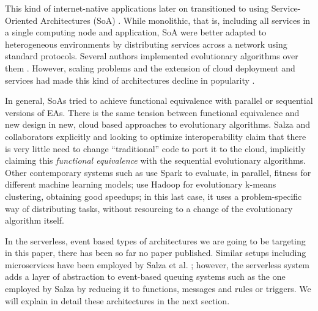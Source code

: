 \documentclass[sigconf]{acmart}
\begin{document}
This kind of internet-native applications later on transitioned to
using Service-Oriented Architectures (SoA) \cite{Papazoglou2007}. While monolithic, that is,
including all services in a single computing node and application, SoA
were better adapted to heterogeneous environments by distributing
services across a network using standard protocols. Several authors
implemented evolutionary algorithms over them
\cite{garcia2013service,munawar2010design,6955331}. However, scaling
problems and the extension of cloud deployment and services had made
this kind of architectures decline in popularity
\cite{Varghese2018849}.

In general, SoAs tried to achieve functional equivalence with parallel
or sequential versions of EAs. There is the same tension between
functional equivalence and new
design in new, cloud based approaches to evolutionary
algorithms. Salza and collaborators \cite{salza2017ccube,de2017parallel} explicitly
and looking to optimize interoperability claim that there is very
little need to change ``traditional'' code to port it to the cloud,
implicitly claiming this {\em functional equivalence} with the
sequential evolutionary algorithms. Other contemporary systems such as
\cite{10.1007/978-3-319-32149-3_46} use Spark to evaluate, in
parallel, fitness for different machine learning models;
\cite{de2015scalable} use Hadoop for evolutionary k-means clustering,
obtaining good speedups; in this last case, it uses a problem-specific
way of distributing tasks, without resourcing to a change of the
evolutionary algorithm itself.

In the serverless, event based types of architectures we are going to
be targeting in this paper, there has been so far no paper
published. Similar setups including microservices have been employed by Salza et
al. \cite{salza2017ccube}; however, the serverless system adds a layer
of abstraction to event-based queuing systems such as the one employed
by Salza by reducing it to functions, messages and rules or
triggers. We will explain in detail these architectures in the next
section.
\end{document}
